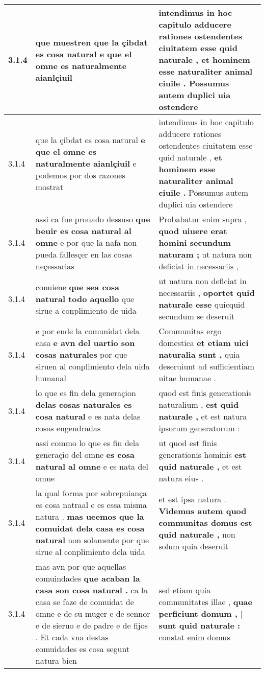 \begin{tabular}{|p{1cm}|p{6.5cm}|p{6.5cm}|}
3.1.4 & que muestren \textbf{ que la çibdat es cosa natural } e que el omne es naturalmente aianlçiuil & intendimus in hoc capitulo adducere rationes ostendentes ciuitatem esse quid naturale , \textbf{ et hominem esse naturaliter animal ciuile . } Possumus autem duplici uia ostendere \\\hline
3.1.4 & que la çibdat es cosa natural \textbf{ e que el omne es naturalmente aianlçiuil } e podemos por dos razones mostrat & intendimus in hoc capitulo adducere rationes ostendentes ciuitatem esse quid naturale , \textbf{ et hominem esse naturaliter animal ciuile . } Possumus autem duplici uia ostendere \\\hline
3.1.4 & assi ca fue prouado dessuso \textbf{ que beuir es cosa natural al omne } e por que la nafa non pueda fallesçer en las cosas neçessarias & Probabatur enim supra , \textbf{ quod uiuere erat homini secundum naturam ; } ut natura non deficiat in necessariis , \\\hline
3.1.4 & conuiene \textbf{ que sea cosa natural todo aquello } que sirue a conplimiento de uida & ut natura non deficiat in necessariis , \textbf{ oportet quid naturale esse } quicquid secundum se deseruit \\\hline
3.1.4 & e por ende la comunidat dela casa \textbf{ e avn del uartio son cosas naturales } por que siruen al conplimiento dela uida humanal & Communitas ergo domestica \textbf{ et etiam uici naturalia sunt , } quia deseruiunt ad sufficientiam uitae humanae . \\\hline
3.1.4 & lo que es fin dela generaçion \textbf{ delas cosas naturales es cosa natural } e es nata delas cosas engendradas & quod est finis generationis naturalium , \textbf{ est quid naturale , } et est natura ipsorum generatorum : \\\hline
3.1.4 & assi commo lo que es fin dela generaçio del omne \textbf{ es cosa natural al omne } e es nata del omne & ut quod est finis generationis hominis \textbf{ est quid naturale , } et est natura eius . \\\hline
3.1.4 & la qual forma por sobrepuiança es cosa natraal e es essa misma natura . \textbf{ mas ueemos que la comuidat dela casa es cosa natural } non solamente por que sirue al conplimiento dela uida & et est ipsa natura . \textbf{ Videmus autem quod communitas domus est quid naturale , } non solum quia deseruit \\\hline
3.1.4 & mas avn por que aquellas comuindades \textbf{ que acaban la casa son cosa natural . } ca la casa se faze de comuidat de omne e de su muger e de sennor e de sieruo e de padre e de fijos . Et cada vna destas comuidades es cosa segunt natura bien & sed etiam quia communitates illae , \textbf{ quae perficiunt domum , | sunt quid naturale : } constat enim domus \\\hline

\end{tabular}
